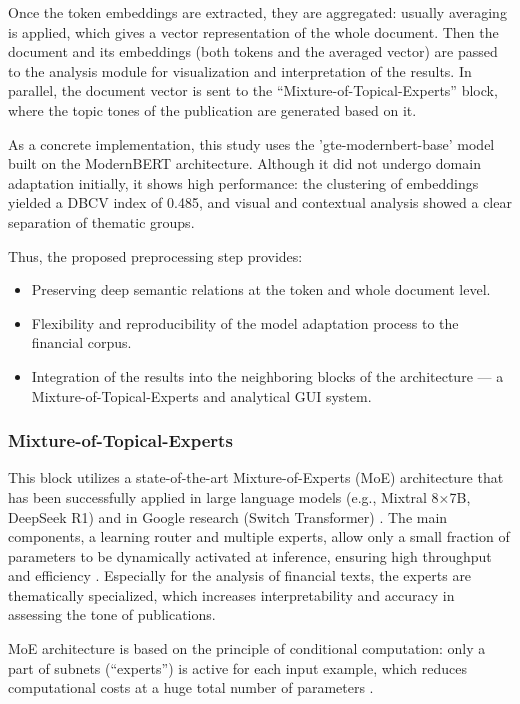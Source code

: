 Once the token embeddings are extracted, they are aggregated: usually averaging is applied, which gives a vector
representation of the whole document. Then the document and its embeddings (both tokens and the averaged vector)
are passed to the analysis module for visualization and interpretation of the results. In parallel, the document
vector is sent to the “Mixture-of-Topical-Experts” block, where the topic tones of the publication are generated
based on it.

As a concrete implementation, this study uses the 'gte-modernbert-base' model built on the ModernBERT architecture.
Although it did not undergo domain adaptation initially, it shows high performance: the clustering of embeddings
yielded a DBCV index of 0.485, and visual and contextual analysis showed a clear separation of thematic groups.

Thus, the proposed preprocessing step provides:

\begin{itemize}
    \item Preserving deep semantic relations at the token and whole document level.
    \item Flexibility and reproducibility of the model adaptation process to the financial corpus.
    \item Integration of the results into the neighboring blocks of the architecture --- a Mixture-of-Topical-Experts
    and analytical GUI system.
\end{itemize}

\subsubsection{Mixture-of-Topical-Experts}

This block utilizes a state-of-the-art Mixture-of-Experts (MoE) architecture that has been successfully
applied in large language models (e.g., Mixtral 8×7B, DeepSeek R1) and in Google research (Switch Transformer)
\parencite{fedus2022switch}. The main components, a learning router and multiple experts, allow only a small fraction
of parameters to be dynamically activated at inference, ensuring high throughput and efficiency
\parencite{shazeer2017outrageously}. Especially for the analysis of financial texts, the experts are thematically
specialized, which increases interpretability and accuracy in assessing the tone of publications.

MoE architecture is based on the principle of conditional computation: only a part of subnets (“experts”) is active
for each input example, which reduces computational costs at a huge total number of parameters
\parencite{shazeer2017outrageously}.

